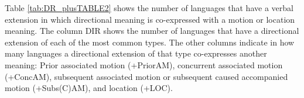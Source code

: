
Table \ref{tab:DR_plusTABLE2} shows the number of languages that have a verbal extension in which directional meaning is co-expressed with a motion or location meaning. The column DIR shows the number of languages that have a directional extension of each of the most common types. The other columns indicate in how many languages a directional extension of that type co-expresses another meaning: Prior associated motion (+PriorAM), concurrent associated motion (+ConcAM), subsequent associated motion or subsequent caused accompanied motion (+Subs(C)AM), and location (+LOC).

